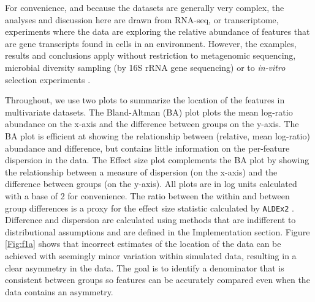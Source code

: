 \documentclass[graybox]{svmult}
\begin{document}
For convenience, and because the datasets are generally very complex, the analyses and discussion here are drawn from RNA-seq, or transcriptome, experiments where the data are exploring the relative abundance of features that are gene transcripts found in cells in an environment. However, the examples, results and conclusions apply without restriction to metagenomic sequencing, microbial diversity sampling (by 16S rRNA gene sequencing) or to \textit{in-vitro} selection experiments \cite{fernandes:2014,mcmurrough:2014,gloorFrontiers:2017}. 

Throughout, we use two plots to summarize the location of the features in multivariate datasets. The Bland-Altman (BA) plot  \cite{altman:1983} plots the mean log-ratio abundance on the x-axis and the difference between groups on the y-axis. The BA plot is efficient at showing the relationship between (relative, mean log-ratio) abundance and difference, but contains little information on the per-feature dispersion in the data. The Effect size plot \cite{gloor:effect} complements the BA plot by showing the relationship between a measure of dispersion (on the x-axis) and the difference between groups (on the y-axis). All plots are in log units calculated with a base of 2 for convenience. The ratio between the within and between group differences is a proxy for the effect size statistic calculated by  \texttt{ALDEx2} . Difference and dispersion are calculated using methods that are indifferent to distributional assumptions and are defined in the Implementation section. Figure \ref{Fig:f1a} shows that incorrect estimates of the location of the data can be achieved with seemingly minor variation within simulated data, resulting in a clear asymmetry in the data. The goal is to identify a denominator that is consistent between groups so features can be accurately compared even when the data contains an asymmetry.
\end{document}
